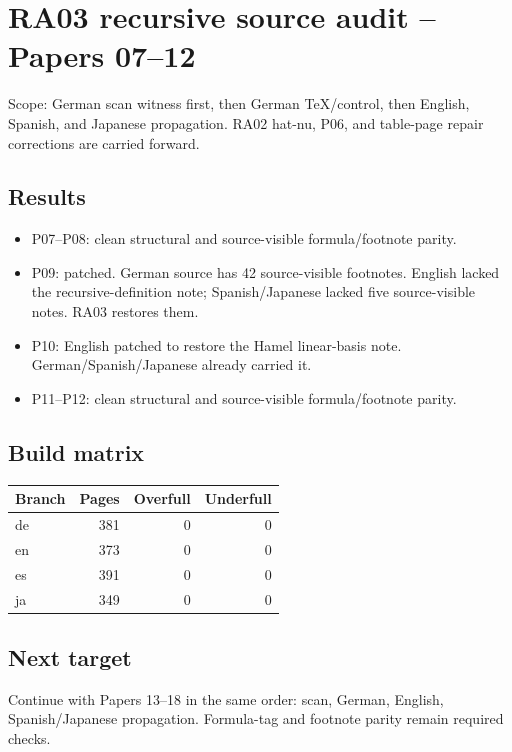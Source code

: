 \documentclass[10pt]{article}
\begin{document}
\section*{RA03 recursive source audit -- Papers 07--12}
Scope: German scan witness first, then German TeX/control, then English, Spanish, and Japanese propagation. RA02 hat-nu, P06, and table-page repair corrections are carried forward.
\subsection*{Results}
\begin{itemize}
\item P07--P08: clean structural and source-visible formula/footnote parity.
\item P09: patched. German source has 42 source-visible footnotes. English lacked the recursive-definition note; Spanish/Japanese lacked five source-visible notes. RA03 restores them.
\item P10: English patched to restore the Hamel linear-basis note. German/Spanish/Japanese already carried it.
\item P11--P12: clean structural and source-visible formula/footnote parity.
\end{itemize}
\subsection*{Build matrix}
\begin{center}
\begin{tabular}{lrrr}
\toprule
Branch & Pages & Overfull & Underfull\\
\midrule
de & 381 & 0 & 0\\
en & 373 & 0 & 0\\
es & 391 & 0 & 0\\
ja & 349 & 0 & 0\\
\bottomrule
\end{tabular}
\end{center}
\subsection*{Next target}
Continue with Papers 13--18 in the same order: scan, German, English, Spanish/Japanese propagation. Formula-tag and footnote parity remain required checks.
\end{document}
